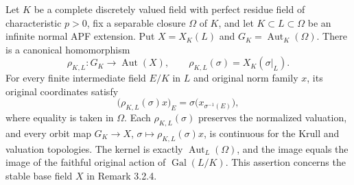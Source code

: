 \begin{theorem}
\label{fw:base-absolute-galois-action}
\leanok
Let $K$ be a complete discretely valued field with perfect residue field
of characteristic $p>0$, fix a separable closure $\Omega$ of $K$, and let
$K\subset L\subset\Omega$ be an infinite normal APF extension.
Put $X=X_K(L)$ and $G_K=\operatorname{Aut}_K(\Omega)$.
There is a canonical homomorphism
\[
 \rho_{K,L}:G_K\longrightarrow\operatorname{Aut}(X),\qquad
 \rho_{K,L}(\sigma)=X_K(\sigma|_L).
\]
For every finite intermediate field $E/K$ in $L$ and original norm
family $x$, its original coordinates satisfy
\[
 \bigl(\rho_{K,L}(\sigma)x\bigr)_E
   =\sigma\bigl(x_{\sigma^{-1}(E)}\bigr),
\]
where equality is taken in $\Omega$. Each $\rho_{K,L}(\sigma)$
preserves the normalized valuation, and every orbit map
$G_K\longrightarrow X$, $\sigma\longmapsto\rho_{K,L}(\sigma)x$,
is continuous for the Krull and valuation topologies.
The kernel is exactly $\operatorname{Aut}_L(\Omega)$, and the image
equals the image of the faithful original action of $\operatorname{Gal}(L/K)$.
This assertion concerns the stable base field $X$ in Remark 3.2.4.
\end{theorem}
